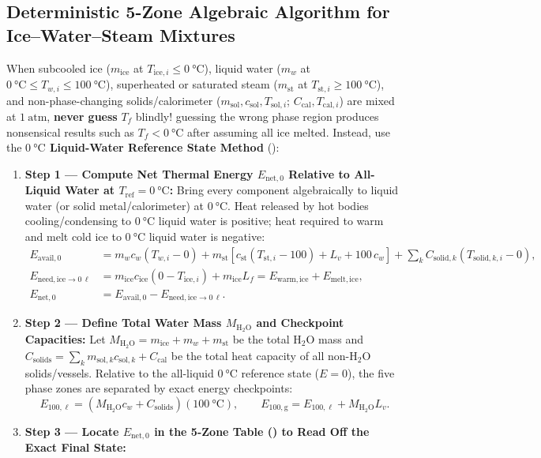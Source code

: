 \subsection{Deterministic 5-Zone Algebraic Algorithm for Ice--Water--Steam Mixtures}
\label{sec:04.3.1}
When subcooled ice ($m_{\mathrm{ice}}$ at $T_{\mathrm{ice},i} \leq \SI{0}{\celsius}$), liquid water ($m_w$ at $\SI{0}{\celsius} \leq T_{w,i} \leq \SI{100}{\celsius}$), superheated or saturated steam ($m_{\mathrm{st}}$ at $T_{\mathrm{st},i} \geq \SI{100}{\celsius}$), and non-phase-changing solids/calorimeter ($m_{\mathrm{sol}}, c_{\mathrm{sol}}, T_{\mathrm{sol},i}$; $C_{\mathrm{cal}}, T_{\mathrm{cal},i}$) are mixed at $\SI{1}{\text{atm}}$, \textbf{never guess} $T_f$ blindly! guessing the wrong phase region produces nonsensical results such as $T_f < \SI{0}{\celsius}$ after assuming all ice melted. Instead, use the \textbf{$\SI{0}{\celsius}$ Liquid-Water Reference State Method} ():

\begin{enumerate}
  \item \textbf{Step 1 --- Compute Net Thermal Energy $E_{\mathrm{net},0}$ Relative to All-Liquid Water at $T_{\mathrm{ref}} = \SI{0}{\celsius}$:}
  Bring every component algebraically to liquid water (or solid metal/calorimeter) at $\SI{0}{\celsius}$. Heat released by hot bodies cooling/condensing to $\SI{0}{\celsius}$ liquid water is positive; heat required to warm and melt cold ice to $\SI{0}{\celsius}$ liquid water is negative:
  \begin{align}\label{eq:04:enet0}
    E_{\mathrm{avail},0} &= m_w c_w (T_{w,i} - 0) + m_{\mathrm{st}}\!\left[c_{\mathrm{st}}(T_{\mathrm{st},i} - 100) + L_v + 100\,c_w\right] + \sum_k C_{\mathrm{solid},k}(T_{\mathrm{solid},k,i} - 0), \\
    E_{\mathrm{need,ice}\to 0\,\ell} &= m_{\mathrm{ice}} c_{\mathrm{ice}}(0 - T_{\mathrm{ice},i}) + m_{\mathrm{ice}} L_f = E_{\mathrm{warm,ice}} + E_{\mathrm{melt,ice}}, \\
    E_{\mathrm{net},0} &= E_{\mathrm{avail},0} - E_{\mathrm{need,ice}\to 0\,\ell}.
  \end{align}
  \item \textbf{Step 2 --- Define Total Water Mass $M_{\mathrm{H_2O}}$ and Checkpoint Capacities:}
  Let $M_{\mathrm{H_2O}} = m_{\mathrm{ice}} + m_w + m_{\mathrm{st}}$ be the total $\mathrm{H_2O}$ mass and $C_{\mathrm{solids}} = \sum_k m_{\mathrm{sol},k} c_{\mathrm{sol},k} + C_{\mathrm{cal}}$ be the total heat capacity of all non-$\mathrm{H_2O}$ solids/vessels. Relative to the all-liquid $\SI{0}{\celsius}$ reference state ($E = 0$), the five phase zones are separated by exact energy checkpoints:
  \begin{equation}\label{eq:04:checkpoints}
    E_{\mathrm{100,\ell}} = (M_{\mathrm{H_2O}} c_w + C_{\mathrm{solids}})(\SI{100}{\celsius}), \qquad
    E_{\mathrm{100,g}} = E_{\mathrm{100,\ell}} + M_{\mathrm{H_2O}} L_v.
  \end{equation}
  \item \textbf{Step 3 --- Locate $E_{\mathrm{net},0}$ in the 5-Zone Table () to Read Off the Exact Final State:}
\end{enumerate}

